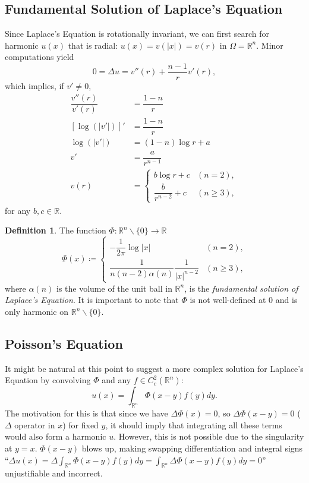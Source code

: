 \documentclass[openany, amssymb, psamsfonts]{amsart}
\theoremstyle{definition}
\newtheorem{defn}{Definition}[section]
\numberwithin{equation}{section}
\newcommand{\bbr}{\mathbb{R}}
\begin{document}
\subsection{Fundamental Solution of Laplace's Equation}
Since Laplace's Equation is rotationally invariant, we can first search for harmonic $u(x)$ that is radial: $u(x) = v(|x|) = v(r)$ in $\Omega = \bbr^n$. Minor computations yield \[
    0 = \Delta u = v''(r) + \dfrac{n-1}{r}v'(r),
\]
which implies, if $v' \neq 0$, \begin{align*}
    \dfrac{v''(r)}{v'(r)} &= \dfrac{1-n}{r} \\
    [\log(|v'|)]'       &= \dfrac{1-n}{r}                                            \\
    \log(|v'|) &= (1-n)\log r + a                                           \\
     v'        &= \dfrac{a}{r^{n-1}}                                        \\
     v(r)       &= \begin{cases}
                                b \log r + c           & (n=2),     \\
                                \dfrac{b}{r^{n-2}} + c & (n \geq 3),
                            \end{cases}
\end{align*}
for any $b, c \in \bbr$.

\begin{defn}
    The function $\Phi: \bbr^n \backslash \{0\} \to \bbr$ \[
        \Phi (x) \coloneqq \begin{cases}
            -\dfrac{1}{2 \pi} \log |x|                      & (n=2),      \\
            \dfrac{1}{n(n-2)\alpha(n)} \dfrac{1}{|x|^{n-2}} & (n \geq 3),
        \end{cases}
    \]
    where $\alpha(n)$ is the volume of the unit ball in $\bbr^n$, is the \textit{fundamental solution of Laplace's Equation}. It is important to note that $\Phi$ is not well-defined at $0$ and is only harmonic on $\bbr^n \backslash \{0\}$.
\end{defn}

\subsection{Poisson's Equation}
It might be natural at this point to suggest a more complex solution for Laplace's Equation by convolving $\Phi$ and any $f \in C^2_c(\bbr^n)$:
\[
    u(x) = \int_{\bbr^n} \Phi(x-y)f(y) dy.
\]
The motivation for this is that since we have $\Delta \Phi(x) = 0$, so $\Delta \Phi(x - y) = 0$ ($\Delta$ operator in $x$) for fixed $y$, it should imply that integrating all these terms would also form a harmonic $u$. However, this is not possible due to the singularity at $y = x$. $\Phi(x-y)$ blows up, making swapping differentiation and integral signs ``$\Delta u(x) = \Delta \int_{\bbr^n} \Phi(x-y)f(y)dy = \int_{\bbr^n} \Delta \Phi (x-y)f(y) dy = 0$'' unjustifiable and incorrect.
\end{document}
